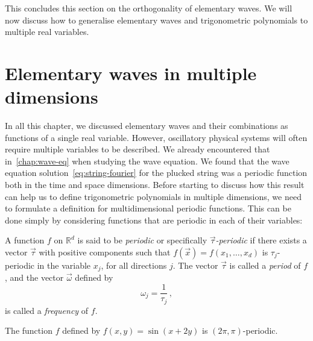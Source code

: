 This concludes this section on the orthogonality of elementary waves. We will now discuss
how to generalise elementary waves and trigonometric polynomials to multiple real
variables.
\section{Elementary waves in multiple dimensions}
In all this chapter, we discussed elementary waves and their combinations as functions of
a single real variable. However, oscillatory physical systems will often require multiple
variables to be described. We already encountered that in~\cref{chap:wave-eq} when
studying the wave equation. We found that the wave equation
solution~\cref{eq:string-fourier} for the plucked string was a periodic function both in
the time and space dimensions. Before starting to discuss how this result can help us to
define trigonometric polynomials in multiple dimensions, we need to formulate a definition
for multidimensional periodic functions. This can be done simply by considering functions
that are periodic in each of their variables:
\begin{definition}
  A function $f$ on $\mathbb{R}^d$ is said to be \emph{periodic} or specifically
  \emph{$\vec{\tau}$-periodic} if there exists a vector $\vec{\tau}$ with positive
  components such that $f(\vec{x})=f(x_1,\dots,x_d)$ is $\tau_j$-periodic in the variable
  $x_j$, for all directions $j$. The vector $\vec{\tau}$ is called a \emph{period} of $f$,
  and the vector $\vec{\omega}$ defined by
  \begin{equation}
    \omega_j=\frac{1}{\tau_j}\,,
  \end{equation}
  is called a \emph{frequency} of $f$.
\end{definition}
\begin{example}
  The function $f$ defined by $f(x,y)=\sin(x+2y)$ is $(2\pi,\pi)$-periodic.
\end{example}

